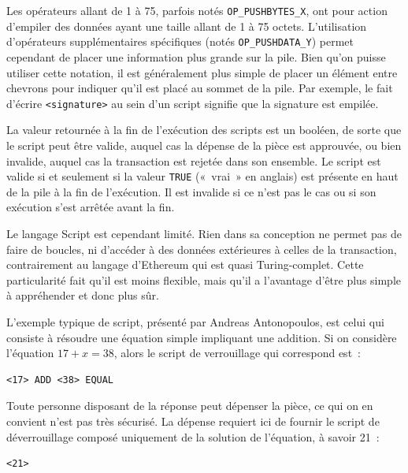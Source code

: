 Les opérateurs allant de 1 à 75, parfois notés \texttt{OP\_PUSHBYTES\_X}, ont pour action d'empiler des données ayant une taille allant de 1 à 75 octets. L'utilisation d'opérateurs supplémentaires spécifiques (notés \texttt{OP\_PUSHDATA\_Y}) permet cependant de placer une information plus grande sur la pile. Bien qu'on puisse utiliser cette notation, il est généralement plus simple de placer un élément entre chevrons pour indiquer qu'il est placé au sommet de la pile. Par exemple, le fait d'écrire \texttt{<signature>} au sein d'un script signifie que la signature est empilée.

La valeur retournée à la fin de l'exécution des scripts est un booléen, de sorte que le script peut être valide, auquel cas la dépense de la pièce est approuvée, ou bien invalide, auquel cas la transaction est rejetée dans son ensemble. Le script est valide si et seulement si la valeur \texttt{TRUE} («~vrai~» en anglais) est présente en haut de la pile à la fin de l'exécution. Il est invalide si ce n'est pas le cas ou si son exécution s'est arrêtée avant la fin.

Le langage Script est cependant limité. Rien dans sa conception ne permet pas de faire de boucles, ni d'accéder à des données extérieures à celles de la transaction, contrairement au langage d'Ethereum qui est quasi Turing-complet. Cette particularité fait qu'il est moins flexible, mais qu'il a l'avantage d'être plus simple à appréhender et donc plus sûr.

L'exemple typique de script, présenté par Andreas Antonopoulos, est celui qui consiste à résoudre une équation simple impliquant une addition. Si on considère l'équation $17 + x = 38$, alors le script de verrouillage qui correspond est~:

\begin{Verbatim}[fontsize=\small]
<17> ADD <38> EQUAL
\end{Verbatim}

Toute personne disposant de la réponse peut dépenser la pièce, ce qui on en convient n'est pas très sécurisé. La dépense requiert ici de fournir le script de déverrouillage composé uniquement de la solution de l'équation, à savoir 21~:

\begin{Verbatim}[fontsize=\small]
<21>
\end{Verbatim}

